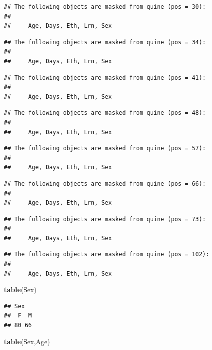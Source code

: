 \documentclass[]{book}
\newenvironment{Shaded}{\begin{snugshade}}{\end{snugshade}}
\newcommand{\KeywordTok}[1]{\textcolor[rgb]{0.13,0.29,0.53}{\textbf{#1}}}
\newcommand{\NormalTok}[1]{#1}
\begin{document}
\begin{verbatim}
## The following objects are masked from quine (pos = 30):
## 
##     Age, Days, Eth, Lrn, Sex
\end{verbatim}

\begin{verbatim}
## The following objects are masked from quine (pos = 34):
## 
##     Age, Days, Eth, Lrn, Sex
\end{verbatim}

\begin{verbatim}
## The following objects are masked from quine (pos = 41):
## 
##     Age, Days, Eth, Lrn, Sex
\end{verbatim}

\begin{verbatim}
## The following objects are masked from quine (pos = 48):
## 
##     Age, Days, Eth, Lrn, Sex
\end{verbatim}

\begin{verbatim}
## The following objects are masked from quine (pos = 57):
## 
##     Age, Days, Eth, Lrn, Sex
\end{verbatim}

\begin{verbatim}
## The following objects are masked from quine (pos = 66):
## 
##     Age, Days, Eth, Lrn, Sex
\end{verbatim}

\begin{verbatim}
## The following objects are masked from quine (pos = 73):
## 
##     Age, Days, Eth, Lrn, Sex
\end{verbatim}

\begin{verbatim}
## The following objects are masked from quine (pos = 102):
## 
##     Age, Days, Eth, Lrn, Sex
\end{verbatim}

\begin{Shaded}
\begin{Highlighting}[]
\KeywordTok{table}\NormalTok{(Sex)}
\end{Highlighting}
\end{Shaded}

\begin{verbatim}
## Sex
##  F  M 
## 80 66
\end{verbatim}

\begin{Shaded}
\begin{Highlighting}[]
\KeywordTok{table}\NormalTok{(Sex,Age)}
\end{Highlighting}
\end{Shaded}
\end{document}
